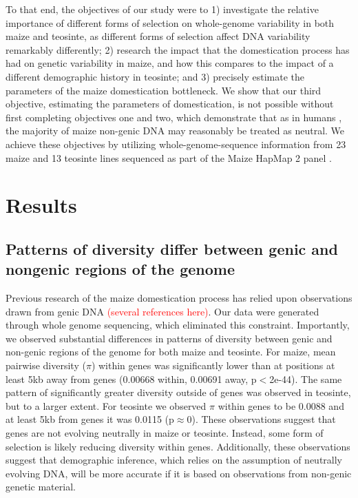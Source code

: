 \documentclass{pnastwo}
\begin{document}
\begin{article}
To that end, the objectives of our study were to 1) investigate the
relative importance of different forms of selection on whole-genome
variability in both maize and teosinte, as different forms of selection affect DNA
variability remarkably differently; 2) research the impact that the
domestication process has had on genetic variability in maize, and how
this compares to the impact of a different demographic history in
teosinte; and 3) precisely estimate the parameters of the
maize domestication bottleneck. We show that our third objective, estimating the
parameters of domestication, is not possible without first completing
 objectives one and two, which demonstrate that as in humans \cite{gazave2014}, the
majority of maize non-genic DNA may reasonably be treated as
neutral. We achieve these objectives by utilizing
whole-genome-sequence information from 23 maize and 13 teosinte lines
sequenced as part of the Maize HapMap 2 panel \cite{chia2012}.


\section{Results}
\subsection{Patterns of diversity differ between genic and
  nongenic regions of the genome}
Previous research of the maize domestication process has relied upon
observations drawn from genic DNA \textcolor{red}{(several references
  here)}. Our data were generated through whole genome sequencing,
which eliminated this constraint. Importantly, we observed substantial
differences in patterns of diversity between genic and non-genic regions
of the genome for both maize and teosinte. For maize, mean pairwise
diversity ($\pi$) within genes was significantly lower than at
positions at least 5kb away from genes (0.00668 within, 0.00691 away, p$<$2e-44). The same
pattern of significantly greater diversity outside of genes was observed in
teosinte, but to a larger extent. For teosinte we observed $\pi$
within genes to be 0.0088 and at least 5kb from genes it was 0.0115
(p$\approx$0). These observations suggest that genes are not evolving
neutrally in maize or teosinte. Instead, some form of selection is likely
reducing diversity within genes. Additionally, these observations
suggest that demographic inference, which relies on the assumption of
neutrally evolving DNA, will be more accurate if it is based on
observations from non-genic genetic material.


\end{article}
\end{document}
